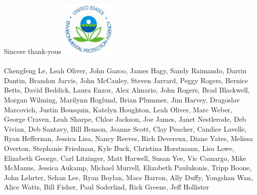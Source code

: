 \documentclass[serif]{beamer}\usepackage[]{graphicx}\usepackage[]{color}
\begin{document}
\begin{frame}{Sincere thank-yous}{}
\hspace{2cm}
\includegraphics[width = 0.2\textwidth]{fig/epa.png}
\hspace{2cm}
 \\~\\
\scriptsize 
Chengfeng Le, Leah Oliver, John Gazoo, James Hagy, Sandy Raimando, Darrin Dantin, Brandon Jarvis, John McCauley, Steven Jarrard, Peggy Rogers, Bernice Betts, David Beddick, Laura Enzor, Alex Almario, John Rogers, Brad Blackwell, Morgan Wilming, Marilynn Hoglund, Brian Plummer, Jim Harvey, Dragoslav Marcovich, Justin Bousquin, Katelyn Houghton, Leah Oliver, Marc Weber, George Craven, Leah Sharpe, Chloe Jackson, Joe James, Janet Nestlerode, Deb Vivian, Deb Santavy, Bill Benson, Jeanne Scott, Clay Peacher, Candice Lavelle, Ryan Heffernan, Jessica Lisa, Nancy Reeves, Rich Devereux, Diane Yates, Melissa Overton, Stephanie Friedman, Kyle Buck, Christina Horstmann, Lisa Lowe, Elizabeth George, Carl Litzinger, Matt Harwell, Susan Yee, Vic Camargo, Mike McManus, Jessica Aukamp, Michael Murrell, Elizabeth Paulukonis, Tripp Boone, John Lehrter, Sehan Lee, Ryan Boylan, Mace Barron, Ally Duffy, Yongshan Wan, Alice Watts, Bill Fisher, Paul Soderlind, Rick Greene, Jeff Hollister
\end{frame}
\end{document}
